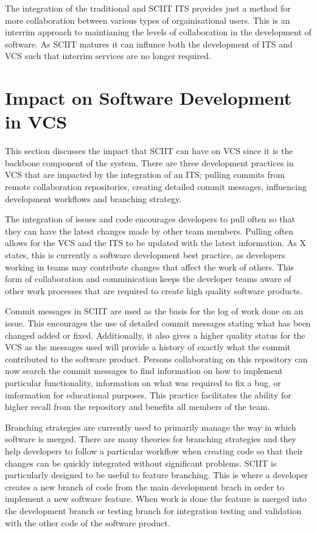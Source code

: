 \documentclass{mproj}
\begin{document}
The integration of the traditional and SCIIT ITS provides just a method for more collaboration between various types of orgainisational users. This is an interrim approach to maintianing the levels of collaboration in the development of software. As SCIIT matures it can influnce both the development of ITS and VCS such that interrim services are no longer required.

\section{Impact on Software Development in VCS}

This section discusses the impact that SCIIT can have on VCS since it is the backbone component of the system. There are three development practices in VCS that are impacted by the integration of an ITS; pulling commits from remote collaboration repositories, creating detailed commit messages, influencing development workflows and branching strategy.

The integration of issues and code encourages developers to pull often so that they can have the latest changes made by other team members. Pulling often allows for the VCS and the ITS to be updated with the latest information. As X states, this is currently a software development best practice, as developers working in teams may contribute changes that affect the work of others. This form of collaboration and comminication keeps the developer teams aware of other work processes that are required to create high quality software products.

Commit messages in SCIIT are used as the basis for the log of work done on an issue. This encourages the use of detailed commit messages stating what has been changed added or fixed. Additionally, it also gives a higher quality status for the VCS as the messages used will provide a history of exactly what the commit contributed to the software product. Persons collaborating on this repository can now search the commit messages to find information on how to implement particular functionality, information on what was required to fix a bug, or imformation for educational purposes. This practice facilitates the ability for higher recall from the repository and benefits all members of the team.

Branching strategies are currently used to primarily manage the way in which software is merged. There are many theories for branching strategies and they help developers to follow a particular workflow when creating code so that their changes can be quickly integrated without significant problems. SCIIT is particularly designed to be useful to feature branching. This is where a developer creates a new branch of code from the main development brach in order to implement a new software feature. When work is done the feature is merged into the development branch or testing branch for integration testing and validation with the other code of the software product.
\end{document}
